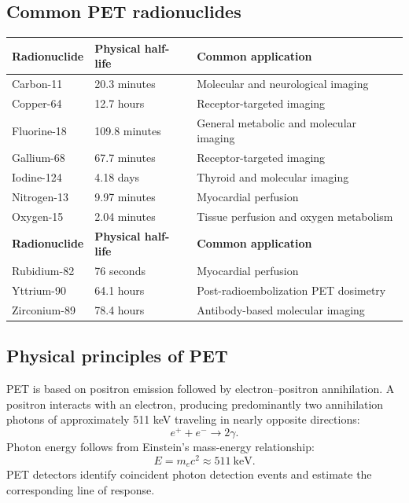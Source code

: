 \subsection{Common PET radionuclides}
\begin{longtable}{@{}p{}p{}p{}@{}}
\toprule
\textbf{Radionuclide} & \textbf{Physical half-life} & \textbf{Common application} \\
\midrule
\endfirsthead
\toprule
Carbon-11 & 20.3 minutes & Molecular and neurological imaging \\
\midrule
\endhead
Copper-64 & 12.7 hours & Receptor-targeted imaging \\
Fluorine-18 & 109.8 minutes & General metabolic and molecular imaging \\
Gallium-68 & 67.7 minutes & Receptor-targeted imaging \\
Iodine-124 & 4.18 days & Thyroid and molecular imaging \\
Nitrogen-13 & 9.97 minutes & Myocardial perfusion \\
Oxygen-15 & 2.04 minutes & Tissue perfusion and oxygen metabolism \\
\textbf{Radionuclide} & \textbf{Physical half-life} & \textbf{Common application} \\
Rubidium-82 & 76 seconds & Myocardial perfusion \\
Yttrium-90 & 64.1 hours & Post-radioembolization PET dosimetry \\
Zirconium-89 & 78.4 hours & Antibody-based molecular imaging \\
\bottomrule
\end{longtable}

\subsection{Physical principles of PET}
PET is based on positron emission followed by electron--positron annihilation. A positron interacts with an electron, producing predominantly two annihilation photons of approximately 511 keV traveling in nearly opposite directions:
\begin{equation}
e^{+}+e^{-}\rightarrow 2\gamma.
\end{equation}
Photon energy follows from Einstein's mass-energy relationship:
\begin{equation}
E=m_e c^2\approx511\ \text{keV}.
\end{equation}
PET detectors identify coincident photon detection events and estimate the corresponding line of response.

